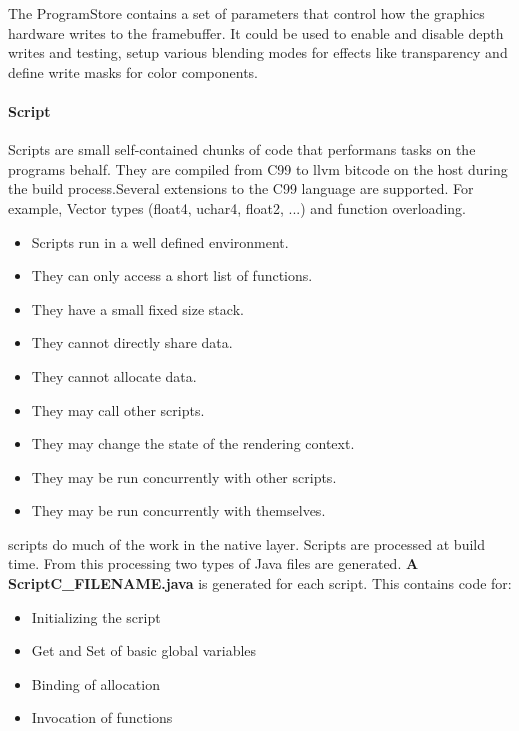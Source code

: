 The \RS{} ProgramStore contains a set of parameters that control how the graphics hardware writes to the framebuffer. It could be used to enable and disable depth writes and testing, setup various blending modes for effects like transparency and define write masks for color components.

\paragraph{Script}
Scripts are small self-contained chunks of code that performans tasks on the programs behalf. They are compiled from C99 to llvm bitcode on the host during the build process.Several extensions to the C99 language are supported. For example, Vector types (float4, uchar4, float2, ...) and function overloading.
\begin{itemize}
\item Scripts run in a well defined environment.
\item They can only access a short list of functions.
\item They have a small fixed size stack.
\item They cannot directly share data.
\item They cannot allocate data.
\item They may call other scripts.
\item They may change the state of the rendering context.
\item They may be run concurrently with other scripts.
\item They may be run concurrently with themselves.
\end{itemize}

\RS{} scripts do much of the work in the native layer. Scripts are processed at build time. From this processing two types of Java files are generated.
\textbf{A ScriptC\_FILENAME.java} is generated for each script.  This contains code for:
\begin{itemize}
\item Initializing the script
\item Get and Set of basic global variables
\item Binding of allocation
\item Invocation of functions
\end{itemize}

